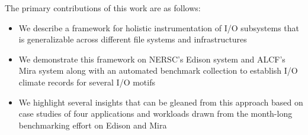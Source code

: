 The primary contributions of this work are as follows:

\begin{itemize}
\item We describe a framework for holistic instrumentation of I/O subsystems that is generalizable across different file systems and infrastructures
\item We demonstrate this framework on NERSC's Edison system and ALCF's Mira system along with an automated benchmark collection to establish I/O climate records for several I/O motifs
\item We highlight several insights that can be gleaned from this approach based on case studies of four applications and workloads drawn from the month-long benchmarking effort on Edison and Mira
\end{itemize}

